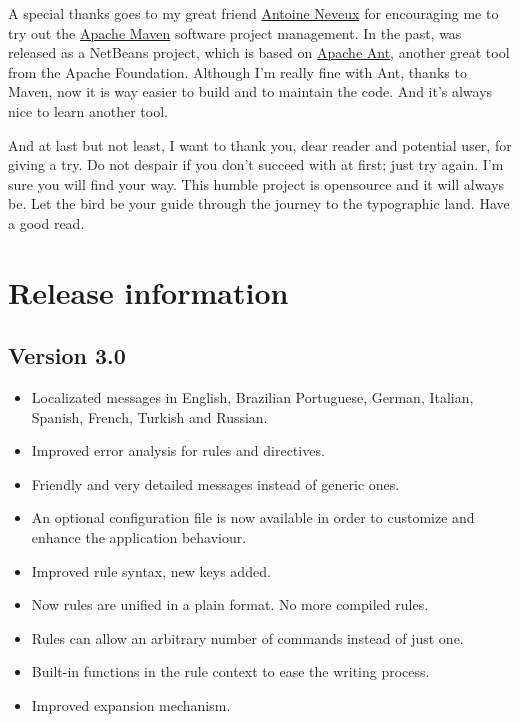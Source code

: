 \documentclass[a4paper,twoside,12pt]{memoir}
\begin{document}
A special thanks goes to my great friend \href{http://antoineneveux.fr/}{Antoine Neveux} for encouraging me to
try out the \href{http://maven.apache.org}{Apache Maven} software project management. In the past, \arara was
released as a NetBeans project, which is based on \href{http://ant.apache.org/}{Apache Ant}, another great tool
from the Apache Foundation. Although I'm really fine with Ant, thanks to Maven, now it is way easier to build and
to maintain the code. And it's always nice to learn another tool.

And at last but not least, I want to thank you, dear reader and potential user, for giving \arara a try. Do not despair
if you don't succeed with \arara at first; just try again. I'm sure you will find your way. This humble project is
opensource and it will always be. Let the bird be your guide through the journey to the typographic land. Have a
good read.

\cleardoublepage

\section*{Release information}

\subsection*{Version 3.0}
\begin{itemize}
\item[\newfeature] Localizated messages in English, Brazilian Portuguese, German, Italian, Spanish, French, Turkish and Russian.
\item[\bugfix] Improved error analysis for rules and directives.
\item[\newfeature] Friendly and very detailed messages instead of generic ones.
\item[\newfeature] An optional configuration file is now available in order to customize and enhance the application behaviour.
\item[\bugfix] Improved rule syntax, new keys added.
\item[\newfeature] Now rules are unified in a plain format. No more compiled rules.
\item[\newfeature] Rules can allow an arbitrary number of commands instead of just one.
\item[\newfeature] Built-in functions in the rule context to ease the writing process.
\item[\bugfix] Improved expansion mechanism.
\end{itemize}
\end{document}
